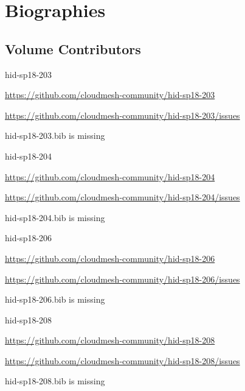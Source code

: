 \part{Biographies}
\chapter{Volume Contributors}


\begin{IU}

hid-sp18-203

\url{https://github.com/cloudmesh-community/hid-sp18-203}

\url{https://github.com/cloudmesh-community/hid-sp18-203/issues}

hid-sp18-203.bib is missing

\end{IU}


\begin{IU}

hid-sp18-204

\url{https://github.com/cloudmesh-community/hid-sp18-204}

\url{https://github.com/cloudmesh-community/hid-sp18-204/issues}

hid-sp18-204.bib is missing

\end{IU}


\begin{IU}

hid-sp18-206

\url{https://github.com/cloudmesh-community/hid-sp18-206}

\url{https://github.com/cloudmesh-community/hid-sp18-206/issues}

hid-sp18-206.bib is missing

\end{IU}


\begin{IU}

hid-sp18-208

\url{https://github.com/cloudmesh-community/hid-sp18-208}

\url{https://github.com/cloudmesh-community/hid-sp18-208/issues}

hid-sp18-208.bib is missing

\end{IU}


